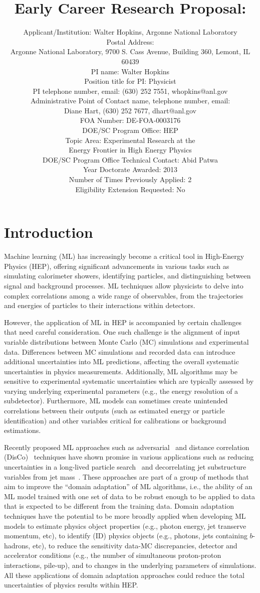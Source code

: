 \documentclass[letter, USenglish, 11pt, subfigure]{article}
\title{Early Career Research Proposal: \\}
\author{Applicant/Institution: Walter Hopkins, Argonne National Laboratory\\ Postal Address: \\Argonne National Laboratory, 9700 S. Cass Avenue, Building 360, Lemont, IL 60439
  \\PI name: Walter Hopkins\\Position title for PI: Physicist\\PI telephone number, email: (630) 252 7551, whopkins@anl.gov\\Administrative Point of Contact name, telephone number, email:\\Diane Hart, (630) 252 7677, dhart@anl.gov\\FOA Number: DE-FOA-0003176\\DOE/SC Program Office: HEP\\ Topic Area: Experimental Research at the \\Energy Frontier in High Energy Physics\\DOE/SC Program Office Technical Contact: Abid Patwa\\Year Doctorate Awarded: 2013\\Number of Times Previously Applied: 2\\Eligibility Extension Requested: No
}
\date{}
\begin{document}
% 

\clearpage
\tableofcontents
\thispagestyle{empty}

\clearpage
{} 
\section{Introduction}

Machine learning (ML) has increasingly become a critical tool in High-Energy Physics (HEP), offering significant advancements in various tasks such as simulating calorimeter showers, identifying particles, and distinguishing between signal and background processes. ML techniques allow physicists to delve into complex correlations among a wide range of observables, from the trajectories and energies of particles to their interactions within detectors. 

However, the application of ML in HEP is accompanied by certain challenges that need careful consideration. One such challenge is the alignment of input variable distributions between Monte Carlo (MC) simulations and experimental data. Differences between MC simulations and recorded data can introduce additional uncertainties into ML predictions, affecting the overall systematic uncertainties in physics measurements. Additionally, ML algorithms may be sensitive to experimental systematic uncertainties which are typically assessed by varying underlying experimental parameters (e.g., the energy resolution of a subdetector). Furthermore, ML models can sometimes create unintended correlations between their outputs (such as estimated energy or particle identification) and other variables critical for calibrations or background estimations.

Recently proposed ML approaches such as adversarial~\cite{louppe2017learning} and distance correlation (DisCo)~\cite{PhysRevLett.125.122001} techniques have shown promise in various applications such as reducing uncertainties in a long-lived particle search~\cite{calRatio} and decorrelating jet substructure variables from jet mass~\cite{ATL-PHYS-PUB-2018-014}.
These approaches are part of a group of methods that aim to improve the ``domain adaptation'' of ML algorithms, i.e., the ability of an ML model trained with one set of data to be robust enough to be applied to data that is expected to be different from the training data. Domain adaptation techniques have the potential to be more broadly applied when developing ML models to estimate physics object properties (e.g., photon energy, jet transerve momentum, etc), to identify (ID) physics objects (e.g., photons, jets containing $b$-hadrons, etc), to reduce the sensitivity data-MC discrepancies, detector and accelerator conditions (e.g., the number of simultaneous proton-proton interactions, pile-up), and to changes in the underlying parameters of simulations. All these applications of domain adaptation approaches could reduce the total uncertainties of physics results within HEP. 
\end{document}
